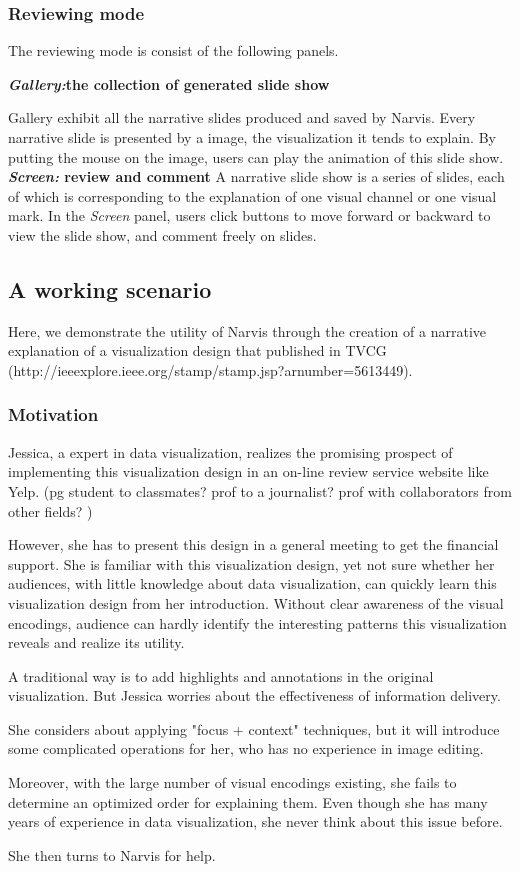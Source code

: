 \documentclass[review,journal]{vgtc}         %
\begin{document}
\subsubsection{Reviewing mode}
The reviewing mode is consist of the following panels. 

\textbf{\textit{Gallery:}the collection of generated slide show}\par Gallery exhibit all the narrative slides produced and saved by Narvis. Every narrative slide is presented by a image, the visualization it tends to explain. By putting the mouse on the image, users can play the animation of this slide show. 
\textbf{\textit{Screen:}  review and comment}
A narrative slide show is a series of slides, each of which is corresponding to the explanation of one visual channel or one visual mark. In the \textit{Screen} panel, users click buttons to move forward or backward to view the slide show, and comment freely on slides. 
\subsection{A working scenario}
Here, we demonstrate the utility of Narvis through the creation of a narrative explanation of a visualization design that published in TVCG (http://ieeexplore.ieee.org/stamp/stamp.jsp?arnumber=5613449). 
\subsubsection{Motivation}Jessica, a expert in data visualization, realizes the promising prospect of implementing this visualization design in an on-line review service website like Yelp. (pg student to classmates? prof to a journalist? prof with collaborators from other fields?  )\par
However, she has to present this design in a general meeting to get the financial support. She is familiar with this visualization design, yet not sure whether her audiences, with little knowledge about data visualization, can quickly learn this visualization design from her introduction. Without clear awareness of the visual encodings, audience can hardly identify the interesting patterns this visualization reveals and realize its utility.  \par
A traditional way is to add highlights and annotations in the original visualization. But Jessica worries about the effectiveness of information delivery. \par
She considers about applying "focus + context" techniques,  but it will introduce some complicated operations for her, who has no experience in image editing. \par
Moreover, with the large number of visual encodings existing, she fails to determine an optimized order for explaining them. Even though she has many years of experience in data visualization, she never think about this issue before. \par
She then turns to Narvis for help. 
\end{document}
